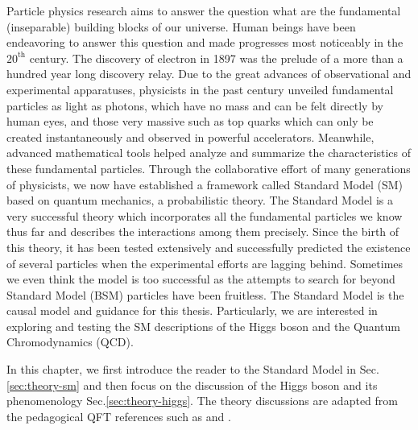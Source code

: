 Particle physics research aims to answer the question what are the fundamental (inseparable) building blocks of our universe. Human beings have been endeavoring to answer this question and made progresses most noticeably in the $20^{\text{th}}$ century. The discovery of electron in 1897 was the prelude of a more than a hundred year long discovery relay. Due to the great advances of observational and experimental apparatuses, physicists in the past century unveiled fundamental particles as light as photons, which have no mass and can be felt directly by human eyes, and those very massive such as top quarks which can only be created instantaneously and observed in powerful accelerators. Meanwhile, advanced mathematical tools helped analyze and summarize the characteristics of these fundamental particles. Through the collaborative effort of many generations of physicists, we now have established a framework called Standard Model (SM) based on quantum mechanics, a probabilistic theory. The Standard Model is a very successful theory which incorporates all the fundamental particles we know thus far and describes the interactions among them precisely. Since the birth of this theory, it has been tested extensively and successfully predicted the existence of several particles when the experimental efforts are lagging behind. Sometimes we even think the model is too successful as the attempts to search for beyond Standard Model (BSM) particles have been fruitless. The Standard Model is the causal model and guidance for this thesis. Particularly, we are interested in exploring and testing the SM descriptions of the Higgs boson and the Quantum Chromodynamics (QCD).

In this chapter, we first introduce the reader to the Standard Model in Sec.\ref{sec:theory-sm} and then focus on the discussion of the Higgs boson and its phenomenology Sec.\ref{sec:theory-higgs}. The theory discussions are adapted from the pedagogical QFT references such as \cite{peskin} and \cite{schwartz}.
